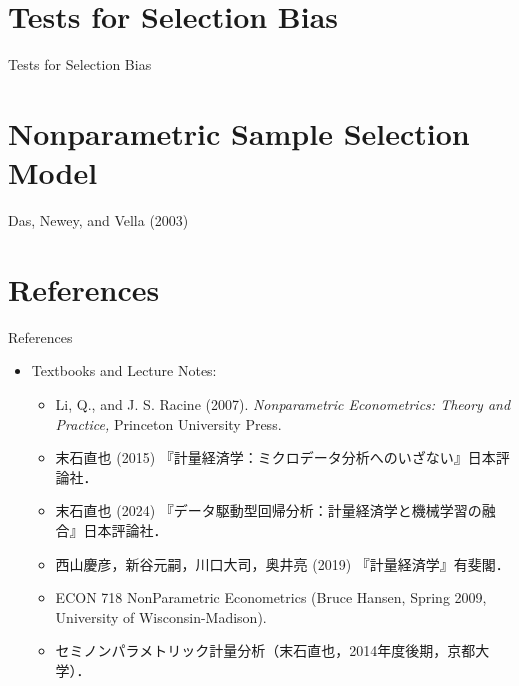 \documentclass[xcolor=svgnames,dvipdfmx,cjk]{beamer}
\theoremstyle{example}
\begin{document}
\section{Tests for Selection Bias}

\begin{frame}{Tests for Selection Bias}
      
\end{frame}


\section{Nonparametric Sample Selection Model}

\begin{frame}{Das, Newey, and Vella (2003)}
      
\end{frame}



\section{References}

\begin{frame}{References}
      \begin{itemize}
            \item Textbooks and Lecture Notes:
                  \begin{itemize}
                        \item Li, Q., and J. S. Racine (2007). 
                              \textit{Nonparametric Econometrics: Theory and Practice,} 
                              Princeton University Press.
                        \item 末石直也 (2015) 『計量経済学：ミクロデータ分析へのいざない』日本評論社．
                        \item 末石直也 (2024) 『データ駆動型回帰分析：計量経済学と機械学習の融合』日本評論社．
                        \item 西山慶彦，新谷元嗣，川口大司，奥井亮 (2019) 『計量経済学』有斐閣．
                        \item ECON 718 NonParametric Econometrics (Bruce Hansen, Spring 2009, University of Wisconsin-Madison).
                        \item セミノンパラメトリック計量分析（末石直也，2014年度後期，京都大学）．
                  \end{itemize}
      \end{itemize}
\end{frame}
\end{document}
